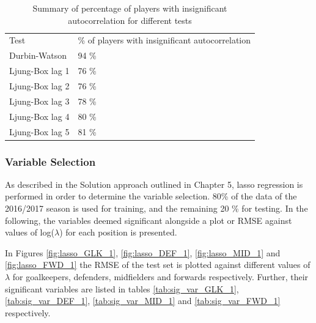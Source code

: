 \begin{table}[H]
\centering
\caption{Summary of percentage of players with insignificant autocorrelation for different tests}
\label{tab:auto_tests}
\begin{tabular}{ll}
Test            & \% of players with insignificant autocorrelation \\
Durbin-Watson   & 94 \%                                            \\
Ljung-Box lag 1 & 76 \%                                            \\
Ljung-Box lag 2 & 76 \%                                            \\
Ljung-Box lag 3 & 78 \%                                            \\
Ljung-Box lag 4 & 80 \%                                            \\
Ljung-Box lag 5 & 81 \%                                           
\end{tabular}
\end{table}

\subsubsection{Variable Selection}

As described in the Solution approach outlined in Chapter 5, lasso regression is performed in order to determine the variable selection. 80\% of the data of the 2016/2017 season is used for training, and the remaining 20 \% for testing. In the following, the variables deemed significant alongside a plot or RMSE against values of log($\lambda$) for each position is presented.\newpar


In Figures \ref{fig:lasso_GLK_1}, \ref{fig:lasso_DEF_1}, \ref{fig:lasso_MID_1} and \ref{fig:lasso_FWD_1} the RMSE of the test set is plotted against different values of $\lambda$ for goalkeepers, defenders, midfielders and forwards respectively. Further, their significant variables are listed in tables \ref{tab:sig_var_GLK_1}, \ref{tab:sig_var_DEF_1}, \ref{tab:sig_var_MID_1} and \ref{tab:sig_var_FWD_1} respectively.

